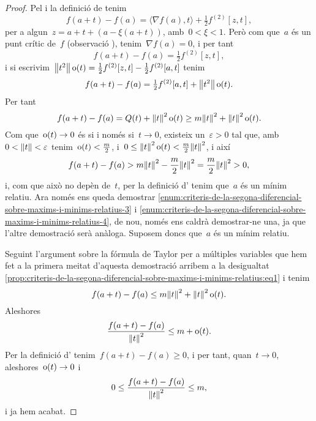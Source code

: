 \documentclass[../../main.tex]{subfiles}
\begin{document}
\begin{proof}
        Pel  i la definició de  tenim
        \[
            f(a+t)-f(a)=\langle\nabla f(a),t\rangle+\tfrac{1}{2}f^{(2)}[z,t],
        \]
        per a algun~\(z=a+t+(a-\xi(a+t))\), amb~\(0<\xi<1\).
        Però com que~\(a\) és un punt crític de~\(f\) (observació ), tenim~\(\nabla f(a)=0\), i per tant
        \[
            f(a+t)-f(a)=\tfrac{1}{2}f^{(2)}[z,t],
        \]
        i si escrivim~\(\norm{t^{2}}\omicron(t)=\frac{1}{2}f^{(2)}[z,t]-\frac{1}{2}f^{(2)}[a,t]\) tenim
        \[
            f(a+t)-f(a)=\tfrac{1}{2}f^{(2)}[a,t]+\norm{t^{2}}\omicron(t).
        \]
        Per tant
        \begin{equation}\label{prop:criteris-de-la-segona-diferencial-sobre-maxims-i-minims-relatius:eq1}
        f(a+t)-f(a)=Q(t)+\norm{t}^{2}\omicron(t)\geq m\norm{t}^{2}+\norm{t}^{2}\omicron(t).
        \end{equation}
        Com que~\(\operatorname{o}(t)\to0\) és si i només si~\(t\to0\), existeix un~\(\varepsilon>0\) tal que, amb~\(0<\norm{t}<\varepsilon\) tenim~\(\operatorname{o}(t)<\frac{m}{2}\), i~\(0\leq\norm{t}^{2}\omicron(t)<\frac{m}{2}\norm{t}^{2}\), i així
        \[
            f(a+t)-f(a)>m\norm{t}^{2}-\frac{m}{2}\norm{t}^{2}=\frac{m}{2}\norm{t}^{2}>0,
        \]
        i, com que això no depèn de~\(t\), per la definició d' tenim que~\(a\) és un mínim relatiu.
        Ara només ens queda demostrar \eqref{enum:criteris-de-la-segona-diferencial-sobre-maxims-i-minims-relatius-3} i \eqref{enum:criteris-de-la-segona-diferencial-sobre-maxims-i-minims-relatius-4}, de nou, només ens caldrà demostrar-ne una, ja que l'altre demostració serà anàloga.
        Suposem doncs que~\(a\) és un mínim relatiu.

        Seguint l'argument sobre la fórmula de Taylor per a múltiples variables que hem fet a la primera meitat d'aquesta demostració arribem a la desigualtat \eqref{prop:criteris-de-la-segona-diferencial-sobre-maxims-i-minims-relatius:eq1} i tenim
        \[
            f(a+t)-f(a)\leq m\norm{t}^{2}+\norm{t}^{2}\omicron(t).
        \]
        Aleshores
        \[
            \frac{f(a+t)-f(a)}{\norm{t}^{2}}\leq m+\omicron(t).
        \]
        Per la definició d' tenim~\(f(a+t)-f(a)\geq0\), i per tant, quan~\(t\to0\), aleshores~\(\operatorname{o}(t)\to0\) i
        \[
            0\leq\frac{f(a+t)-f(a)}{\norm{t}^{2}}\leq m,
        \]
        i ja hem acabat.
    \end{proof}
\end{document}
